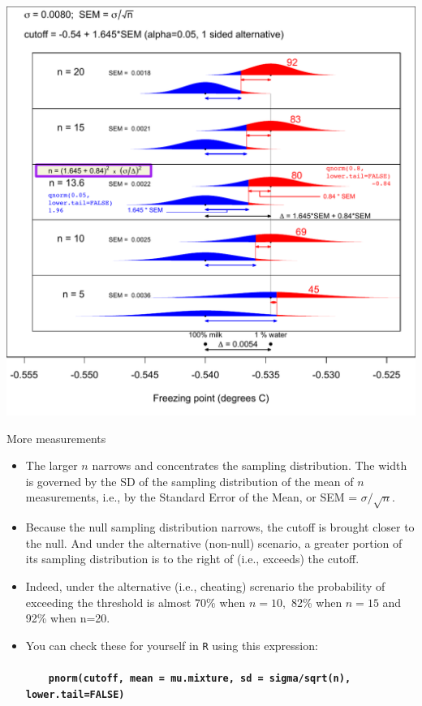 \documentclass{beamer}\usepackage[]{graphicx}\usepackage[]{color}
\begin{document}
\begin{frame}
\begin{center}
	\includegraphics[scale=0.5]{SampleSize1pctWaterAdded.pdf} 
\end{center}
\end{frame}


\begin{frame}{More measurements}
\begin{itemize}
	\item The larger $n$ narrows and concentrates the sampling distribution. The width is governed by the SD of the sampling distribution of the mean of $n$ measurements, i.e., by the Standard Error of the Mean, or SEM = $\sigma/\sqrt{n}$.

\item Because the null sampling distribution narrows, the cutoff is brought closer to the null.
And under the alternative (non-null) scenario, a greater portion of its sampling distribution is to
the right of (i.e., exceeds) the cutoff.

\item Indeed, under the alternative (i.e., cheating) screnario the probability of exceeding the threshold  is almost 70\% when $n=10,$ 82\% when $n=15$ and 92\% when n=20.
\item 
You can check these for yourself in \texttt{R} using this expression:\\ \ \\
{ \footnotesize
	\ \ \ \ \texttt{\textbf{pnorm(cutoff, mean = mu.mixture, sd = sigma/sqrt(n), lower.tail=FALSE)} }  \\ \ \\
} 
\end{itemize}
\end{frame}
\end{document}
